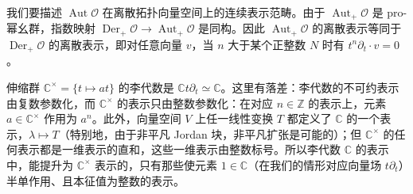 我们要描述 $\operatorname{Aut}\mathcal{O}$ 在离散拓扑向量空间上的连续表示范畴。由于 $\operatorname{Aut}_+\mathcal{O}$ 是 pro-幂幺群，指数映射 $\operatorname{Der}_+\mathcal{O}\to\operatorname{Aut}_+\mathcal{O}$ 是同构。因此 $\operatorname{Aut}_+\mathcal{O}$ 的离散表示等同于 $\operatorname{Der}_+\mathcal{O}$ 的离散表示，即对任意向量 $v$，当 $n$ 大于某个正整数 $N$ 时有 $t^n\partial_t\cdot v=0$。


伸缩群 $\mathbb{C}^\times=\{t\mapsto at\}$ 的李代数是 $\mathbb{C}t\partial_t\simeq\mathbb{C}$。这里有落差：李代数的不可约表示由复数参数化，而 $\mathbb{C}^\times$ 的表示只由整数参数化：在对应 $n\in\mathbb{Z}$ 的表示上，元素 $a\in\mathbb{C}^\times$ 作用为 $a^n$。此外，向量空间 $V$ 上任一线性变换 $T$ 都定义了 $\mathbb{C}$ 的一个表示，$\lambda\mapsto T$（特别地，由于非平凡 Jordan 块，非平凡扩张是可能的）；但 $\mathbb{C}^\times$ 的任何表示都是一维表示的直和，这些一维表示由整数标号。所以李代数 $\mathbb{C}$ 的表示中，能提升为 $\mathbb{C}^\times$ 表示的，只有那些使元素 $1\in\mathbb{C}$（在我们的情形对应向量场 $t\partial_t$）半单作用、且本征值为整数的表示。


